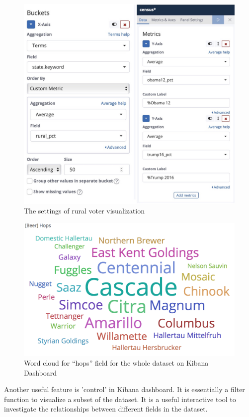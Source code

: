 \documentclass[bibliography=totoc]{article}
\begin{document}
\begin{figure}
  \centering
  \includegraphics[width=\linewidth]{rural_voters_settings.png}
 \caption{The settings of rural voter visualization}
  \label{fig:rural_voters_settings}
\end{figure}

\begin{figure}
  \centering
  \includegraphics[width=\linewidth]{beer_hops.png}
 \caption{Word cloud for ``hops'' field for the whole dataset on Kibana Dashboard}
  \label{fig:beer_hops}
\end{figure}

Another useful feature is 'control' in Kibana dashboard. It is essentially a filter function to visualize a subset of the dataset. It is a useful interactive tool to investigate the relationships between different fields in the dataset.
\end{document}
